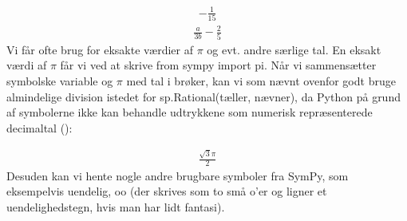 \documentclass[letterpaper,10pt,english]{jupyterBook}
\begin{document}
\begin{sphinxVerbatim}[commandchars=\\\{\}]
   
   
  

   
   
  
\end{sphinxVerbatim}
\begin{equation*}
\begin{split}\displaystyle - \frac{1}{15}\end{split}
\end{equation*}\begin{equation*}
\begin{split}\displaystyle \frac{a}{3 b} - \frac{2}{5}\end{split}
\end{equation*}
Vi får ofte brug for eksakte værdier af \(\pi\) og evt. andre særlige tal. En eksakt værdi af \(\pi\) får vi ved at skrive from sympy import pi. Når vi sammensætter symbolske variable og \(\pi\) med tal i brøker, kan vi som nævnt ovenfor godt bruge almindelige division istedet for sp.Rational(tæller, nævner), da Python på grund af symbolerne ikke kan behandle udtrykkene som numerisk repræsenterede decimaltal ():

\begin{sphinxVerbatim}[commandchars=\\\{\}]
   
      
\end{sphinxVerbatim}
\begin{equation*}
\begin{split}\displaystyle \frac{\sqrt{3} \pi}{2}\end{split}
\end{equation*}
Desuden kan vi hente nogle andre brugbare symboler fra SymPy, som eksempelvis uendelig, oo (der skrives som to små o’er og ligner et uendelighedstegn, hvis man har lidt fantasi).
\end{document}
